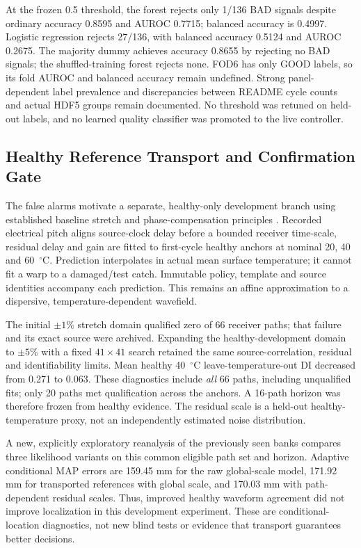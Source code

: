 At the frozen 0.5 threshold, the forest rejects only 1/136 BAD signals despite
ordinary accuracy 0.8595 and AUROC 0.7715; balanced accuracy is 0.4997.
Logistic regression rejects 27/136, with balanced accuracy 0.5124 and AUROC
0.2675. The majority dummy achieves accuracy 0.8655 by rejecting no BAD signals;
the shuffled-training forest rejects none. FOD6 has only GOOD labels, so its
fold AUROC and balanced accuracy remain undefined. Strong panel-dependent
label prevalence and discrepancies between README cycle counts and actual
HDF5 groups remain documented. No threshold was retuned on held-out labels,
and no learned quality classifier was promoted to the live controller.

\subsection{Healthy Reference Transport and Confirmation Gate}
The false alarms motivate a separate, healthy-only development branch using
established baseline stretch and phase-compensation principles
\cite{croxford2010temperature,herdovics2019phase}. Recorded electrical pitch
aligns source-clock delay before a bounded receiver time-scale, residual delay
and gain are fitted to first-cycle healthy anchors at nominal 20, 40 and
60~$^{\circ}$C. Prediction interpolates in actual mean surface temperature;
it cannot fit a warp to a damaged/test catch. Immutable policy, template and
source identities accompany each prediction. This remains an affine
approximation to a dispersive, temperature-dependent wavefield.

The initial $\pm1\%$ stretch domain qualified zero of 66 receiver paths;
that failure and its exact source were archived. Expanding the healthy-development
domain to $\pm5\%$ with a fixed $41\times41$ search retained the same
source-correlation, residual and identifiability limits. Mean healthy
40~$^{\circ}$C leave-temperature-out DI decreased from 0.271 to 0.063.
These diagnostics include \emph{all} 66 paths, including unqualified fits;
only 20 paths met qualification across the anchors. A 16-path horizon was
therefore frozen from healthy evidence. The residual scale is a held-out
healthy-temperature proxy, not an independently estimated noise distribution.

A new, explicitly exploratory reanalysis of the previously seen banks compares
three likelihood variants on this common eligible path set and horizon.
Adaptive conditional MAP errors are 159.45 mm for the raw global-scale model,
171.92 mm for transported references with global scale, and 170.03 mm with
path-dependent residual scales. Thus, improved healthy waveform agreement
did not improve localization in this development experiment. These are
conditional-location diagnostics, not new blind tests or evidence that
transport guarantees better decisions.

